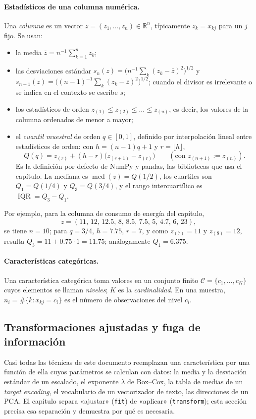 \documentclass[11pt,a4paper]{article}
\theoremstyle{plain}
\theoremstyle{definition}
\theoremstyle{remark}
\newcommand{\R}{\mathbb{R}}
\newcommand{\med}{\operatorname{med}}
\newcommand{\IQR}{\operatorname{IQR}}
\newcommand{\1}{\mathbf{1}}
\begin{document}
\paragraph{Estadísticos de una columna numérica.} Una \emph{columna} es un
vector $z=(z_1,\dots,z_n)\in\R^n$, típicamente $z_k=x_{kj}$ para un $j$
fijo. Se usan:
\begin{itemize}[leftmargin=*]
\item la media $\bar z=n^{-1}\sum_{k=1}^nz_k$;
\item las desviaciones estándar
$s_n(z)=\bigl(n^{-1}\sum_k(z_k-\bar z)^2\bigr)^{1/2}$ y
$s_{n-1}(z)=\bigl((n-1)^{-1}\sum_k(z_k-\bar z)^2\bigr)^{1/2}$; cuando el
divisor es irrelevante o se indica en el contexto se escribe $s$;
\item los estadísticos de orden $z_{(1)}\le z_{(2)}\le\dots\le z_{(n)}$,
es decir, los valores de la columna ordenados de menor a mayor;
\item el \emph{cuantil muestral} de orden $q\in[0,1]$, definido por
interpolación lineal entre estadísticos de orden: con $h=(n-1)q+1$ y
$r=\lfloor h\rfloor$,
\[
Q(q)=z_{(r)}+(h-r)\bigl(z_{(r+1)}-z_{(r)}\bigr)\qquad(\text{con }z_{(n+1)}:=z_{(n)}).
\]
Es la definición por defecto de NumPy y pandas, las bibliotecas que usa el
capítulo. La mediana es $\med(z)=Q(1/2)$, los cuartiles son
$Q_1=Q(1/4)$ y $Q_3=Q(3/4)$, y el rango intercuartílico es
$\IQR=Q_3-Q_1$.
\end{itemize}
Por ejemplo, para la columna de consumo de energía del capítulo,
\[
z=(11,\,12,\,12.5,\,8,\,8.5,\,7.5,\,5,\,4.7,\,6,\,23),
\]
se tiene $n=10$; para $q=3/4$,
$h=7.75$, $r=7$, y como $z_{(7)}=11$ y $z_{(8)}=12$, resulta
$Q_3=11+0.75\cdot1=11.75$; análogamente $Q_1=6.375$.

\paragraph{Características categóricas.} Una característica categórica
toma valores en un conjunto finito $\mathcal C=\{c_1,\dots,c_K\}$ cuyos
elementos se llaman \emph{niveles}; $K$ es la \emph{cardinalidad}. En una
muestra, $n_i=\#\{k:x_{kj}=c_i\}$ es el número de observaciones del nivel
$c_i$.

\subsection{Transformaciones ajustadas y fuga de información}

Casi todas las técnicas de este documento reemplazan una característica
por una función de ella cuyos parámetros se calculan con datos: la media y
la desviación estándar de un escalado, el exponente $\lambda$ de Box--Cox,
la tabla de medias de un \emph{target encoding}, el vocabulario de un
vectorizador de texto, las direcciones de un PCA. El capítulo separa
«ajustar» (\texttt{fit}) de «aplicar» (\texttt{transform}); esta sección
precisa esa separación y demuestra por qué es necesaria.
\end{document}
